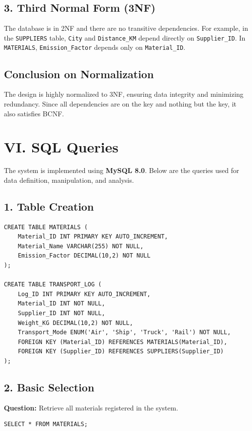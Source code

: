 \documentclass[12pt,a4paper]{article}
\begin{document}
\subsection*{3. Third Normal Form (3NF)}
The database is in 2NF and there are no transitive dependencies. For example, in the \texttt{SUPPLIERS} table, \texttt{City} and \texttt{Distance\_KM} depend directly on \texttt{Supplier\_ID}. In \texttt{MATERIALS}, \texttt{Emission\_Factor} depends only on \texttt{Material\_ID}.

\subsection*{Conclusion on Normalization}
The design is highly normalized to 3NF, ensuring data integrity and minimizing redundancy. Since all dependencies are on the key and nothing but the key, it also satisfies BCNF.

\newpage

\section*{VI. SQL Queries}

The system is implemented using \textbf{MySQL 8.0}. Below are the queries used for data definition, manipulation, and analysis.

\subsection*{1. Table Creation}
\begin{lstlisting}
CREATE TABLE MATERIALS (
    Material_ID INT PRIMARY KEY AUTO_INCREMENT,
    Material_Name VARCHAR(255) NOT NULL,
    Emission_Factor DECIMAL(10,2) NOT NULL
);

CREATE TABLE TRANSPORT_LOG (
    Log_ID INT PRIMARY KEY AUTO_INCREMENT,
    Material_ID INT NOT NULL,
    Supplier_ID INT NOT NULL,
    Weight_KG DECIMAL(10,2) NOT NULL,
    Transport_Mode ENUM('Air', 'Ship', 'Truck', 'Rail') NOT NULL,
    FOREIGN KEY (Material_ID) REFERENCES MATERIALS(Material_ID),
    FOREIGN KEY (Supplier_ID) REFERENCES SUPPLIERS(Supplier_ID)
);
\end{lstlisting}

\subsection*{2. Basic Selection}
\textbf{Question:} Retrieve all materials registered in the system.
\begin{lstlisting}
SELECT * FROM MATERIALS;
\end{lstlisting}
\end{document}
